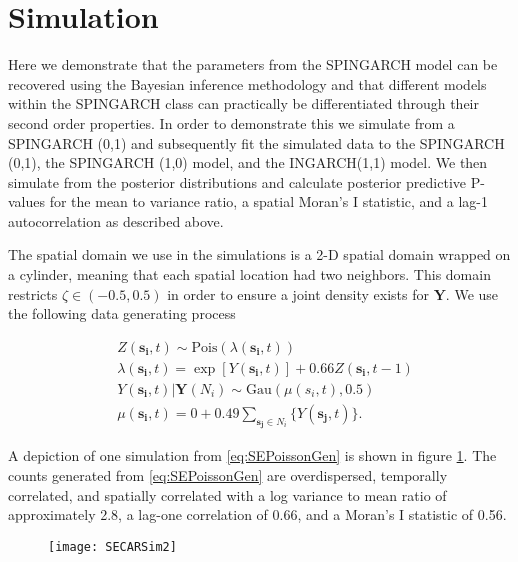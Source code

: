 \documentclass[11pt]{isuthesis}
\begin{document}
\section{Simulation}

Here we demonstrate that the parameters from the SPINGARCH model can be recovered using the Bayesian inference methodology and that different models within the SPINGARCH class can practically be differentiated through their second order properties.  In order to demonstrate this we simulate from a SPINGARCH (0,1) and subsequently fit the simulated data to the SPINGARCH (0,1), the SPINGARCH (1,0) model, and the INGARCH(1,1) model.  We then simulate from the posterior distributions and calculate posterior predictive P-values for the mean to variance ratio, a spatial Moran's I statistic, and a lag-1 autocorrelation as described above.

The spatial domain we use in the simulations is a 2-D spatial domain wrapped on a cylinder, meaning that each spatial location had two neighbors.  This domain restricts $\zeta \in (-0.5,0.5)$ in order to ensure a joint density exists for $\boldsymbol{Y}$.  We use the following data generating process

\begin{align}
	& Z(\boldsymbol{s_i},t)  \sim\mbox{Pois}(\lambda(\boldsymbol{s_i},t))\nonumber\\
	& \lambda(\boldsymbol{s_i},t) =\exp \left[ Y(\boldsymbol{s_i},t) \right] + 0.66 Z(\boldsymbol{s_i},t-1)\nonumber\\
	& Y(\boldsymbol{s_i},t)|\boldsymbol{Y}(N_i)  \sim \mbox{Gau}(\mu(s_i,t),0.5)\nonumber\\ 
	& \mu(\boldsymbol{s_i},t)  = 0+ 0.49 \sum_{\boldsymbol{s_j} \in N_i} \{Y(\boldsymbol{s_j},t)\}\label{eq:SEPoissonGen}.
\end{align}

A depiction of one simulation from \eqref{eq:SEPoissonGen} is shown in figure \ref{fig:SEPoissonGen}.  The counts generated from \eqref{eq:SEPoissonGen} are overdispersed, temporally correlated, and spatially correlated  with a log variance to mean ratio of approximately 2.8, a lag-one correlation of 0.66, and a Moran's I statistic of 0.56.


\begin{figure}[!htp]
	\centering
	\texttt{[image: SECARSim2]}
	\label{fig:SEPoissonGen}
\end{figure}
\end{document}
